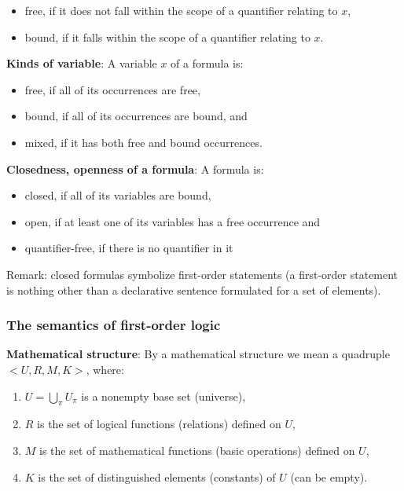 \documentclass[margin=0px]{article}
\begin{document}
\begin{itemize}
    \item	free, if it does not fall within the scope of a quantifier relating to $x$,

    \item	bound, if it falls within the scope of a quantifier relating to $x$.
\end{itemize}

\noindent \textbf{Kinds of variable}: A variable $x$ of a formula is:

\begin{itemize}
    \item	free, if all of its occurrences are free,

    \item	bound, if all of its occurrences are bound, and

    \item	mixed, if it has both free and bound occurrences.
\end{itemize}

\noindent \textbf{Closedness, openness of a formula}: A formula is:

\begin{itemize}
    \item	closed, if all of its variables are bound,

    \item	open, if at least one of its variables has a free occurrence and

    \item	quantifier-free, if there is no quantifier in it
\end{itemize}

Remark: closed formulas symbolize first-order statements (a first-order statement is nothing other than a declarative sentence formulated for a set of elements).

\subsubsection{The semantics of first-order logic}

\noindent \textbf{Mathematical structure}: By a mathematical structure we mean a quadruple $<U, R, M, K>$, where:

\begin{enumerate}
    \item	$U = \bigcup_{\pi} U_{\pi}$ is a nonempty base set (universe),

    \item	$R$ is the set of logical functions (relations) defined on $U$,

    \item	$M$ is the set of mathematical functions (basic operations) defined on $U$,

    \item	$K$ is the set of distinguished elements (constants) of $U$ (can be empty).
\end{enumerate}
\end{document}
